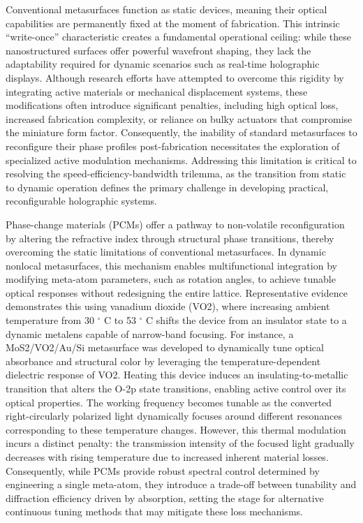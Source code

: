 \documentclass[11pt]{article}
\begin{document}
Conventional metasurfaces function as static devices, meaning their optical capabilities are permanently fixed at the moment of fabrication. This intrinsic ``write-once'' characteristic creates a fundamental operational ceiling: while these nanostructured surfaces offer powerful wavefront shaping, they lack the adaptability required for dynamic scenarios such as real-time holographic displays. \citep{doi_10_1002_lpor_71186_5fa1be75} Although research efforts have attempted to overcome this rigidity by integrating active materials or mechanical displacement systems, these modifications often introduce significant penalties, including high optical loss, increased fabrication complexity, or reliance on bulky actuators that compromise the miniature form factor. Consequently, the inability of standard metasurfaces to reconfigure their phase profiles post-fabrication necessitates the exploration of specialized active modulation mechanisms. Addressing this limitation is critical to resolving the speed-efficiency-bandwidth trilemma, as the transition from static to dynamic operation defines the primary challenge in developing practical, reconfigurable holographic systems. \citep{doi_10_1002_nap2_70185_56c8ab30}

Phase-change materials (PCMs) offer a pathway to non-volatile reconfiguration by altering the refractive index through structural phase transitions, thereby overcoming the static limitations of conventional metasurfaces. \citep{doi_10_1515_nanoph_2024_0357_805aeaf6} In dynamic nonlocal metasurfaces, this mechanism enables multifunctional integration by modifying meta-atom parameters, such as rotation angles, to achieve tunable optical responses without redesigning the entire lattice. Representative evidence demonstrates this using vanadium dioxide (VO2), where increasing ambient temperature from 30 \(^\circ\) C to 53 \(^\circ\) C shifts the device from an insulator state to a dynamic metalens capable of narrow-band focusing. For instance, a MoS2/VO2/Au/Si metasurface was developed to dynamically tune optical absorbance and structural color by leveraging the temperature-dependent dielectric response of VO2. Heating this device induces an insulating-to-metallic transition that alters the O-2p state transitions, enabling active control over its optical properties. \citep{doi_10_1515_nanoph_2023_0169_6ba026c6} The working frequency becomes tunable as the converted right-circularly polarized light dynamically focuses around different resonances corresponding to these temperature changes. However, this thermal modulation incurs a distinct penalty: the transmission intensity of the focused light gradually decreases with rising temperature due to increased inherent material losses. Consequently, while PCMs provide robust spectral control determined by engineering a single meta-atom, they introduce a trade-off between tunability and diffraction efficiency driven by absorption, setting the stage for alternative continuous tuning methods that may mitigate these loss mechanisms. \citep{doi_10_1515_nanoph_2024_0357_805aeaf6}
\end{document}
